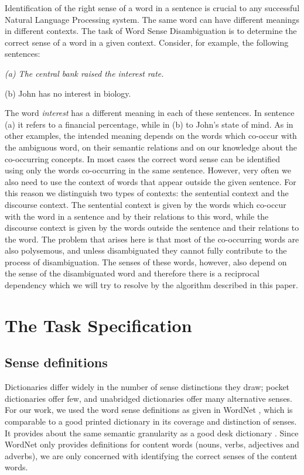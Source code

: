 Identification of the right sense of a word in a sentence is crucial to any successful Natural Language Processing system. The same word can have different meanings in different contexts. The task of Word Sense Disambiguation is to determine the correct sense of a word in a given context. Consider, for example, the following sentences:

{\it
\hspace*{2cm}
                (a) The central bank raised the interest rate.

\hspace*{2cm}
                (b) John has no interest in biology.
}

\noindent
The word {\it interest} has a different meaning in each of these sentences. In sentence (a) it refers to a financial percentage, while in (b) to John's state of mind. As in other examples, the intended meaning depends on the words which co-occur with the ambiguous word, on their semantic relations and on our knowledge about the co-occurring concepts. In most cases the correct word sense can be identified using only the words co-occurring in the same sentence. However, very often we also need to use the context of words that appear outside the given sentence. For this reason we distinguish two types of contexts: the sentential context and the discourse context. The sentential context is given by the words which co-occur with the word in a sentence and by their relations to this word, while the discourse context is given by the words outside the sentence and their relations to the word. The problem that arises here is that most of the co-occurring words are also polysemous, and unless disambiguated they cannot fully contribute to the process of disambiguation. The senses of these words, however, also depend on the sense of the disambiguated word and therefore there is a reciprocal dependency which we will try to resolve by the algorithm described in this paper.

\section{The Task Specification}

\subsection{Sense definitions}
Dictionaries differ widely in the number of sense distinctions they draw; pocket dictionaries offer few, and unabridged dictionaries offer many alternative senses. For our work, we used the word sense definitions as given in WordNet \cite{Miller90A}, which is comparable to a good printed dictionary in its coverage and distinction of senses. It provides about the same semantic granularity as a good desk dictionary \cite{Miller94}. Since WordNet only provides definitions for content words (nouns, verbs, adjectives and adverbs), we are only concerned with identifying the correct senses of the content words.

